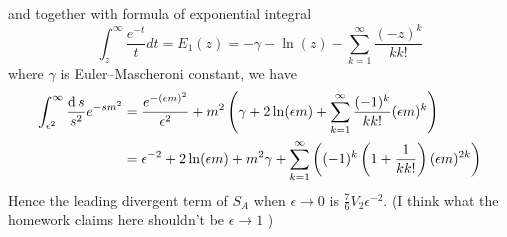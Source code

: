 and together with formula of exponential integral
\[
 \int_{z}^{\infty} \frac{e^{-t}}{t} d t = E_1(z) = -\gamma -\ln(z) -\sum_{k=1}^{\infty} \frac{(-z)^k}{k k!}
\]
where $\gamma$ is Euler–Mascheroni constant, we have 
\begin{equation}
	\begin{split}
	\int_{\epsilon^2}^{\infty}\frac{\operatorname{d} s}{s^2}e^{-sm^2} &= \frac{e^{-(\epsilon m)^2}}{\epsilon^2} + m^2 \left( \gamma + 2 \ln(\epsilon m) + \sum_{k=1}^{\infty} \frac{(-1)^k}{k k!} (\epsilon m)^k \right) \\
	&= \epsilon^{-2} + 2\ln (\epsilon m) + m^2 \gamma + \sum_{k=1}^{\infty} \left( (-1)^{k} \left( 1+ \frac{1}{k k!}\right) (\epsilon m)^{2k}\right)
	\end{split}
\end{equation}
Hence the leading divergent term of $S_A$ when $\epsilon \to 0$  is $\frac{7}{6} V_2 \epsilon^{-2}$. (I think what the homework claims here shouldn't be $\epsilon \to 1$ )